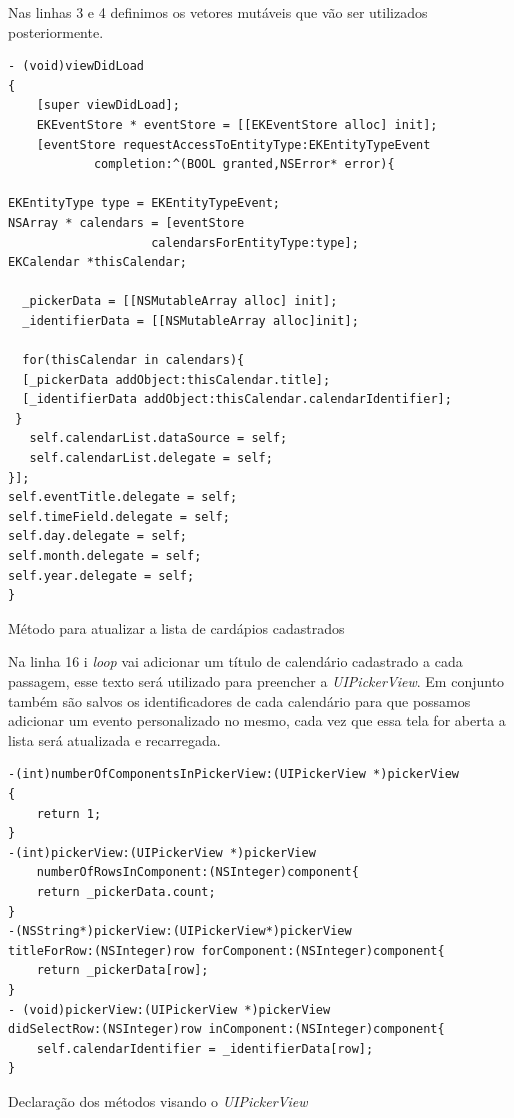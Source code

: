 \documentclass[a4paper,12pt,brazil,oneside]{book}
\begin{document}
Nas linhas 3 e 4 definimos os vetores mutáveis que vão ser utilizados posteriormente.

\begin{listing}[H]
\begin{verbatim}
- (void)viewDidLoad
{
    [super viewDidLoad];
    EKEventStore * eventStore = [[EKEventStore alloc] init];
    [eventStore requestAccessToEntityType:EKEntityTypeEvent 
    		completion:^(BOOL granted,NSError* error){
        
EKEntityType type = EKEntityTypeEvent;
NSArray * calendars = [eventStore 
        			calendarsForEntityType:type];
EKCalendar *thisCalendar;
      
  _pickerData = [[NSMutableArray alloc] init];
  _identifierData = [[NSMutableArray alloc]init];
       
  for(thisCalendar in calendars){
  [_pickerData addObject:thisCalendar.title];
  [_identifierData addObject:thisCalendar.calendarIdentifier];
 }
   self.calendarList.dataSource = self;
   self.calendarList.delegate = self;
}];
self.eventTitle.delegate = self;
self.timeField.delegate = self;
self.day.delegate = self;
self.month.delegate = self;
self.year.delegate = self;
}
\end{verbatim}
\caption{Método para atualizar a lista de cardápios cadastrados}
\end{listing}

Na linha 16 i \emph{loop} vai adicionar um título de calendário cadastrado a cada passagem, esse texto será utilizado para preencher a \emph{UIPickerView}. Em conjunto também são salvos os identificadores de cada calendário para que possamos adicionar um evento personalizado no mesmo, cada vez que essa tela for aberta a lista será atualizada e recarregada.

\begin{listing}[H]
\begin{verbatim}
-(int)numberOfComponentsInPickerView:(UIPickerView *)pickerView
{
    return 1;
}
-(int)pickerView:(UIPickerView *)pickerView 
	numberOfRowsInComponent:(NSInteger)component{
    return _pickerData.count;
}
-(NSString*)pickerView:(UIPickerView*)pickerView 
titleForRow:(NSInteger)row forComponent:(NSInteger)component{
    return _pickerData[row];
}
- (void)pickerView:(UIPickerView *)pickerView 
didSelectRow:(NSInteger)row inComponent:(NSInteger)component{
    self.calendarIdentifier = _identifierData[row];
}
\end{verbatim}
\caption{Declaração dos métodos visando o \emph{UIPickerView}}
\end{listing}
\end{document}
